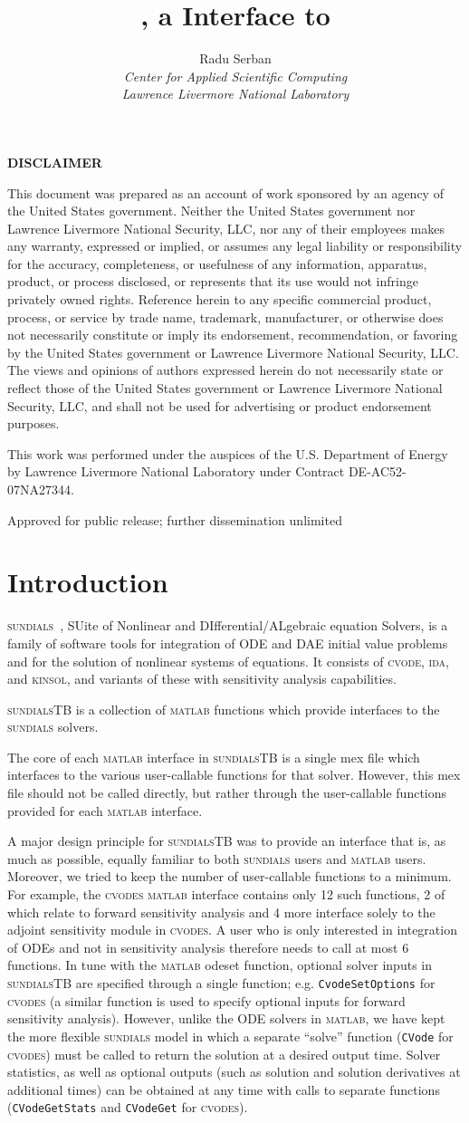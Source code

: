 \documentclass[titlepage,10pt]{article}
\title{{\sundialsTB} {\STBrelease}, a {\matlab} Interface to {\sundials}}
\author{
  Radu Serban \\ 
  {\em Center for Applied Scientific Computing} \\ 
  {\em Lawrence Livermore National Laboratory}
}
\date{
  \today
  \vfill 
  {\centerline{\psfig{figure=doc_logo.eps,width=0.5\textwidth}}}
  \vfill \STBucrl}
\newcommand{\disclaimer}{%
\changetext{.625in}{}{}{}{}
\thispagestyle{empty}%
\vglue5\baselineskip
\begin{center}
{\bf DISCLAIMER}
\end{center}
\noindent
This document was prepared as an account of work sponsored by an agency of 
the United States government. Neither the United States government nor 
Lawrence Livermore National Security, LLC, nor any of their employees makes 
any warranty, expressed or implied, or assumes any legal liability or responsibility 
for the accuracy, completeness, or usefulness of any information, apparatus, product, 
or process disclosed, or represents that its use would not infringe privately owned rights. 
Reference herein to any specific commercial product, process, or service by trade name, 
trademark, manufacturer, or otherwise does not necessarily constitute or imply its endorsement, 
recommendation, or favoring by the United States government or Lawrence Livermore National 
Security, LLC. The views and opinions of authors expressed herein do not necessarily state
or reflect those of the United States government or Lawrence Livermore National Security, LLC, 
and shall not be used for advertising or product endorsement purposes.

\vskip2\baselineskip
\noindent
This work was performed under the auspices of the U.S. Department of Energy by Lawrence 
Livermore National Laboratory under Contract DE-AC52-07NA27344.
\vfill
\begin{center}
Approved for public release; further dissemination unlimited
\end{center}
\clearpage
\changetext{-.625in}{}{}{}{}
}
\newcommand{\clearemptydoublepage}{\newpage{\pagestyle{empty}\cleardoublepage}}
\newcommand{\sundialsTB}{{\normalfont\scshape sundialsTB}}
\newcommand{\sundials}{{\normalfont\scshape sundials}}
\newcommand{\cvode}{{\normalfont\scshape cvode}}
\newcommand{\cvodes}{{\normalfont\scshape cvodes}}
\newcommand{\ida}{{\normalfont\scshape ida}}
\newcommand{\kinsol}{{\normalfont\scshape kinsol}}
\newcommand{\matlab}{{\normalfont\scshape matlab}}
\begin{document}
\pagestyle{empty}
\maketitle
\disclaimer

\tableofcontents

\clearemptydoublepage

\pagestyle{plain}

\section{Introduction}

{\sundials}~\cite{HBGLSSW:04}, SUite of Nonlinear and DIfferential/ALgebraic equation Solvers,
is a family of software tools for integration of ODE and DAE initial value problems
and for the solution of nonlinear systems of equations.
It consists of {\cvode}, {\ida}, and {\kinsol}, and variants of these with 
sensitivity analysis capabilities.

{\sundialsTB} is a collection of {\matlab} functions which provide interfaces to
the {\sundials} solvers.

The core of each {\matlab} interface in {\sundialsTB} is a single {\sc mex} 
file which interfaces to the various user-callable functions for that solver.
However, this {\sc mex} file should not be called directly, but rather through the 
user-callable functions provided for each {\matlab} interface.

A major design principle for {\sundialsTB}
was to provide an interface that is, as much as possible, equally familiar to
both {\sundials} users and {\matlab} users. Moreover, we tried to keep the
number of user-callable functions to a minimum. For example, the {\cvodes} {\matlab} 
interface contains only 12 such functions, 2 of which relate to forward sensitivity analysis and
4 more interface solely to the adjoint sensitivity module in {\cvodes}. 
A user who is only interested in integration of ODEs and not in sensitivity analysis
therefore needs to call at most 6 functions.
In tune with the {\matlab} {\sc odeset} function, optional
solver inputs in {\sundialsTB} are specified through a single function; e.g.
{\tt CvodeSetOptions} for {\cvodes} (a similar function is used to specify optional
inputs for forward sensitivity analysis). However, unlike the ODE solvers in {\matlab}, we
have kept the more flexible {\sundials} model in which a separate ``solve'' function 
({\tt CVode} for {\cvodes}) must be called to return the solution at a desired 
output time. Solver statistics, as well as optional outputs (such as
solution and solution derivatives at additional times) can be obtained at any time
with calls to separate functions ({\tt CVodeGetStats} and {\tt CVodeGet} for {\cvodes}).
\end{document}
